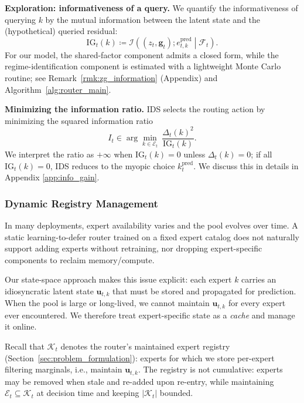 \textbf{Exploration: informativeness of a query.}
We quantify the informativeness of querying \(k\) by the mutual information between the latent state
and the (hypothetical) queried residual:
\begin{equation}
\label{eq:ig_operational}
\mathrm{IG}_t(k)
\coloneqq
\mathcal{I}\left((z_t,\mathbf{g}_t); e_{t,k}^{\mathrm{pred}} \middle| \mathcal{F}_t\right).
\end{equation}
For our model, the shared-factor component admits a closed form, while the regime-identification
component is estimated with a lightweight Monte Carlo routine; see Remark~\ref{rmk:zg_information}
(Appendix) and Algorithm~\ref{alg:router_main}.

\textbf{Minimizing the information ratio.}
IDS selects the routing action by minimizing the squared information ratio
\begin{equation}
\label{eq:ids_deterministic}
I_t \in \arg\min_{k\in\mathcal{E}_t}\ \frac{\Delta_t(k)^2}{\mathrm{IG}_t(k)}.
\end{equation}
We interpret the ratio as \(+\infty\) when \(\mathrm{IG}_t(k)=0\) unless \(\Delta_t(k)=0\); if all
\(\mathrm{IG}_t(k)=0\), IDS reduces to the myopic choice \(k_t^{\mathrm{pred}}\). We discuss this in details in Appendix \ref{app:info_gain}. 


\subsubsection{Dynamic Registry Management}
\label{sec:registry}

In many deployments, expert availability varies and the pool evolves over time. A static
learning-to-defer router \citep{madras2018predict, mozannar2021consistent} trained on a fixed expert catalog does not naturally support
adding experts
without retraining, nor dropping expert-specific components to reclaim memory/compute.

Our state-space approach makes this issue explicit: each expert \(k\) carries an idiosyncratic latent
state \(\mathbf{u}_{t,k}\) that must be stored and propagated for prediction. When the pool is large
or long-lived, we cannot maintain \(\mathbf{u}_{t,k}\) for every expert ever encountered. We therefore
treat expert-specific state as a \emph{cache} and manage it online.

Recall that \(\mathcal{K}_t\) denotes the router's maintained expert registry
(Section~\ref{sec:problem_formulation}): experts for which we store per-expert filtering marginals,
i.e., maintain \(\mathbf{u}_{t,k}\). The registry is not cumulative: experts may be removed when stale
and re-added upon re-entry, while maintaining \(\mathcal{E}_t\subseteq \mathcal{K}_t\) at decision time
and keeping \(|\mathcal{K}_t|\) bounded.

